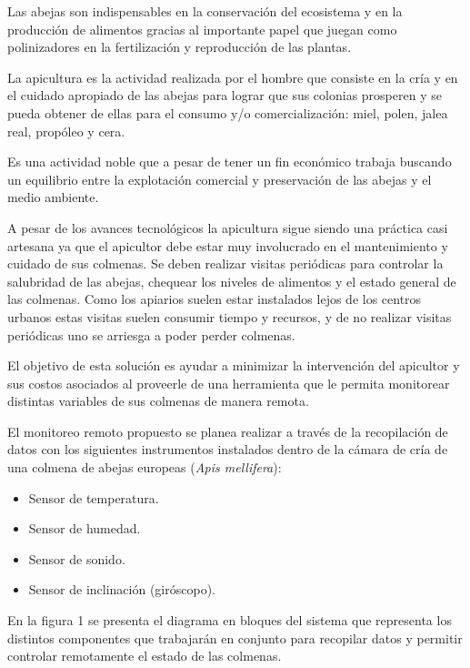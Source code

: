 \documentclass[
11pt, %
codirector, %
]{charter}
\begin{document}
Las abejas son indispensables en la conservación del ecosistema y en la producción de alimentos gracias al importante papel que juegan como polinizadores en la fertilización y reproducción de las plantas.

La apicultura es la actividad realizada por el hombre que consiste en la cría y en el cuidado apropiado de las abejas para lograr que sus colonias prosperen y se pueda obtener de ellas para el consumo y/o comercialización: miel, polen, jalea real, propóleo y cera.

Es una actividad noble que a pesar de tener un fin económico trabaja buscando un equilibrio entre la explotación comercial y preservación de las abejas y el medio ambiente.

A pesar de los avances tecnológicos la apicultura sigue siendo una práctica casi artesana ya que el apicultor debe estar muy involucrado en el mantenimiento y cuidado de sus colmenas. Se deben realizar visitas periódicas para controlar la salubridad de las abejas, chequear los niveles de alimentos y el estado general de las colmenas.
Como los apiarios suelen estar instalados lejos de los centros urbanos estas visitas suelen consumir tiempo y recursos, y de no realizar visitas periódicas uno se arriesga a poder perder colmenas.

El objetivo de esta solución es ayudar a minimizar la intervención del apicultor y sus costos asociados al proveerle de una herramienta que le permita monitorear distintas variables de sus colmenas de manera remota.


El monitoreo remoto propuesto se planea realizar a través de la recopilación de datos con los siguientes instrumentos instalados dentro de la cámara de cría de una colmena de abejas europeas (\textit{Apis mellifera}):
\begin{itemize}
\item Sensor de temperatura. 
\item Sensor de humedad.
\item Sensor de sonido.
\item Sensor de inclinación (giróscopo).
\end{itemize}


En la figura 1 se presenta el diagrama en bloques del sistema que representa los distintos componentes que trabajarán en conjunto para recopilar datos y permitir controlar remotamente el estado de las colmenas.
\end{document}
